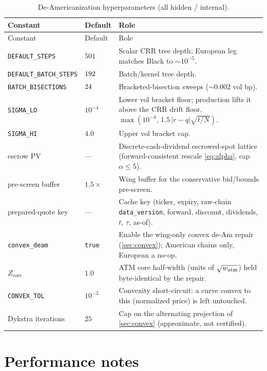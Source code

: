 \documentclass[11pt]{article}
\begin{document}
\begin{longtable}{p{}p{}p{}}
\caption{De-Americanization hyperparameters (all hidden / internal).}\label{tab:atlas}\\
\toprule Constant & Default & Role\\ \midrule
\endfirsthead \toprule Constant & Default & Role\\ \midrule \endhead
\texttt{DEFAULT\_STEPS} & $501$ & Scalar CRR tree depth; European leg matches Black to $\sim10^{-5}$.\\
\texttt{DEFAULT\_BATCH\_STEPS} & $192$ & Batch/kernel tree depth.\\
\texttt{BATCH\_BISECTIONS} & $24$ & Bracketed-bisection sweeps ($\sim0.002$ vol bp).\\
\texttt{SIGMA\_LO} & $10^{-4}$ & Lower vol bracket floor; production lifts it
above the CRR drift floor, $\max(10^{-4},\,1.5\,|r-q|\sqrt{t/N})$.\\
\texttt{SIGMA\_HI} & $4.0$ & Upper vol bracket cap.\\
escrow PV & --- & Discrete-cash-dividend escrowed-spot lattice
(forward-consistent rescale \cref{eq:alpha}, cap $\alpha\le5$).\\
pre-screen buffer & $1.5\times$ & Wing buffer for the conservative bid/bounds pre-screen.\\
prepared-quote key & --- & Cache key (ticker, expiry, raw-chain
\texttt{data\_version}, forward, discount, dividends, $t$, $\tau$, as-of).\\
\texttt{convex\_deam} & \texttt{true} & Enable the wing-only convex de-Am repair
(\cref{sec:convex}); American chains only, European a no-op.\\
$Z_{\text{core}}$ & $1.0$ & ATM core half-width (units of $\sqrt{w_{\mathrm{atm}}}$) held
byte-identical by the repair.\\
\texttt{CONVEX\_TOL} & $10^{-3}$ & Convexity short-circuit: a curve convex to this
(normalized price) is left untouched.\\
Dykstra iterations & $25$ & Cap on the alternating projection of
\cref{sec:convex} (approximate, not certified).\\
\bottomrule
\end{longtable}

\section{Performance notes}
\label{app:perf}
\end{document}
